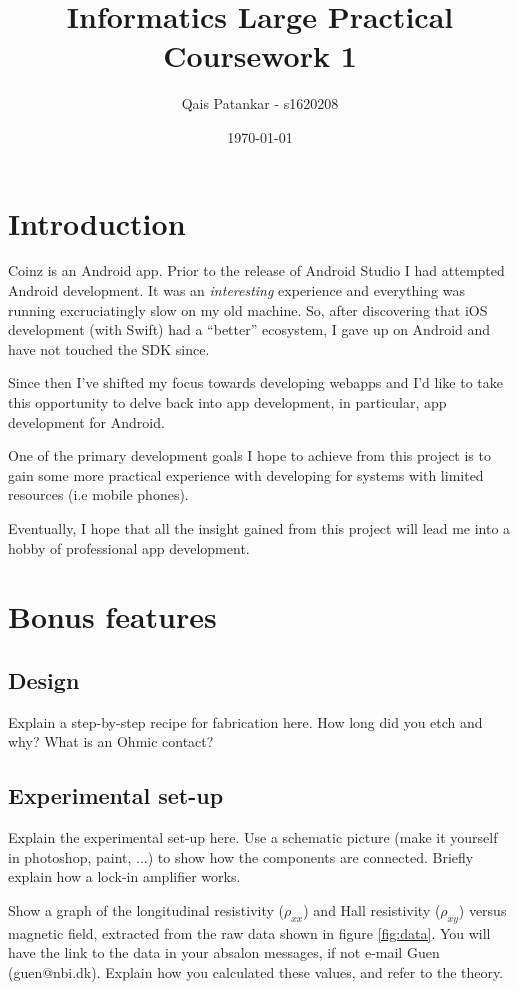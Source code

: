 \documentclass[a4paper]{article}
\title{Informatics Large Practical \\ \large{Coursework 1}}
\author{Qais Patankar - s1620208}
\date{\today}
\begin{document}
\maketitle

\section{Introduction}
\label{sec:introduction}

Coinz is an Android app. Prior to the release of Android Studio I had attempted Android development. It was an \textit{interesting} experience and everything was running excruciatingly slow on my old machine. So, after discovering that iOS development (with Swift) had a ``better'' ecosystem, I gave up on Android and have not touched the SDK since.

Since then I've shifted my focus towards developing webapps and I'd like to take this opportunity to delve back into app development, in particular, app development for Android.

One of the primary development goals I hope to achieve from this project is to gain some more practical experience with developing for systems with limited resources (i.e mobile phones).

Eventually, I hope that all the insight gained from this project will lead me into a hobby of professional app development.

\section{Bonus features}
\label{sec:bonus}
\subsection{Design}
Explain a step-by-step recipe for fabrication here. How long did you etch and why? What is an Ohmic contact?
\subsection{Experimental set-up}
Explain the experimental set-up here. Use a schematic picture (make it yourself in photoshop, paint, ...) to show how the components are connected. Briefly explain how a lock-in amplifier works.

Show a graph of the longitudinal resistivity ($\rho_{xx}$) and Hall resistivity ($\rho_{xy}$) versus magnetic field, extracted from the raw data shown in figure \ref{fig:data}. You will have the link to the data in your absalon messages, if not e-mail Guen (guen@nbi.dk). Explain how you calculated these values, and refer to the theory.
\end{document}
